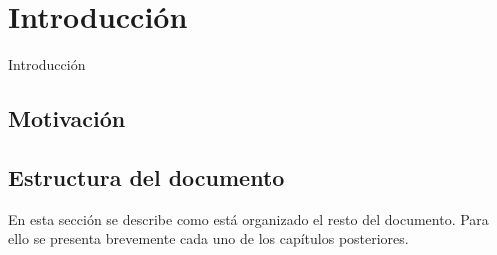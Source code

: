 \chapter{Introducción} %
	
Introducción


\section{Motivación}


\section{Estructura del documento}
En esta sección se describe como está organizado el resto del documento. Para ello se presenta brevemente cada uno de los capítulos posteriores.


